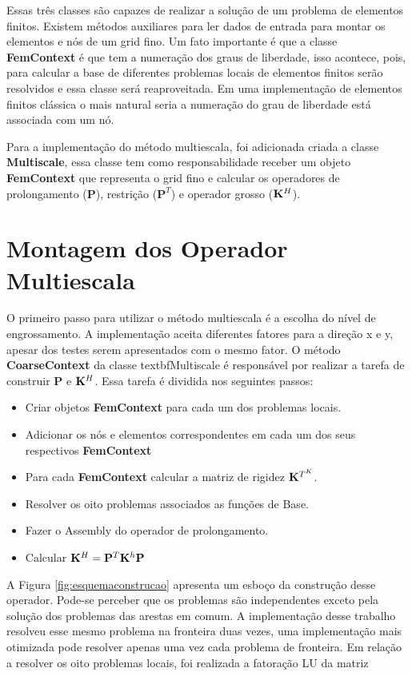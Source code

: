 Essas três classes são capazes de realizar a solução de um problema de elementos finitos. Existem métodos auxiliares para ler dados de entrada para montar os elementos e nós de um grid fino. Um fato importante é que a classe \textbf{FemContext} é que tem a numeração dos graus de liberdade, isso acontece, pois, para calcular a base de diferentes problemas locais de elementos finitos serão resolvidos e essa classe será reaproveitada. Em uma implementação de elementos finitos clássica o mais natural seria a numeração do grau de liberdade está associada com um nó.


Para a implementação do método multiescala, foi adicionada criada a classe \textbf{Multiscale}, essa classe tem como responsabilidade receber um objeto \textbf{FemContext} que representa o grid fino e calcular os operadores de prolongamento ($\mathbf{P}$), restrição ($\mathbf{P}^T$) e operador grosso ($\mathbf{K}^H$).


\section{Montagem dos Operador Multiescala}

O primeiro passo para utilizar o método multiescala é a escolha do nível de engrossamento. A implementação aceita diferentes fatores para a direção x e y, apesar dos testes serem apresentados com o mesmo fator. O método \textbf{CoarseContext} da classe textbf{Multiscale} é responsável por realizar a tarefa de construir $\mathbf{P}$ e $\mathbf{K}^H$. Essa tarefa é dividida nos seguintes passos: 

\begin{itemize}
    \item Criar objetos \textbf{FemContext} para cada um dos problemas locais.
    \item Adicionar os nós e elementos correspondentes em cada um dos seus respectivos \textbf{FemContext}
    \item Para cada \textbf{FemContext} calcular a matriz de rigidez $\mathbf{K}^{T^K}$.
    \item Resolver os oito problemas associados as funções de Base.
    \item Fazer o Assembly do operador de prolongamento.
    \item Calcular $\mathbf{K}^H = \mathbf{P}^T \mathbf{K}^h \mathbf{P}$
\end{itemize}

A Figura \ref{fig:esquemaconstrucao} apresenta um esboço da construção desse operador. Pode-se perceber que os problemas são independentes exceto pela solução dos problemas das arestas em comum. A implementação desse trabalho resolveu esse mesmo problema na fronteira duas vezes, uma implementação mais otimizada pode resolver apenas uma vez cada problema de fronteira. Em relação a resolver os oito problemas locais, foi realizada a fatoração LU da matriz 

